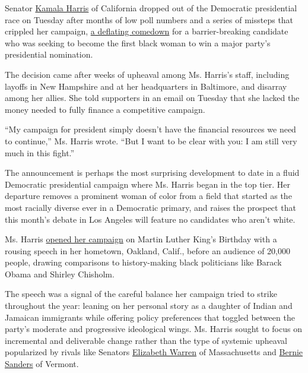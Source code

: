 Senator
\href{https://www.nytimes.com/interactive/2020/us/elections/kamala-harris.html}{Kamala
Harris} of California dropped out of the Democratic presidential race on
Tuesday after months of low poll numbers and a series of missteps that
crippled her campaign,
\href{https://www.nytimes.com/2019/11/29/us/politics/kamala-harris-2020.html}{a
deflating comedown} for a barrier-breaking candidate who was seeking to
become the first black woman to win a major party's presidential
nomination.

The decision came after weeks of upheaval among Ms. Harris's staff,
including layoffs in New Hampshire and at her headquarters in Baltimore,
and disarray among her allies. She told supporters in an email on
Tuesday that she lacked the money needed to fully finance a competitive
campaign.

``My campaign for president simply doesn't have the financial resources
we need to continue,'' Ms. Harris wrote. ``But I want to be clear with
you: I am still very much in this fight.''

The announcement is perhaps the most surprising development to date in a
fluid Democratic presidential campaign where Ms. Harris began in the top
tier. Her departure removes a prominent woman of color from a field that
started as the most racially diverse ever in a Democratic primary, and
raises the prospect that this month's debate in Los Angeles will feature
no candidates who aren't white.

Ms. Harris
\href{https://www.nytimes.com/2019/01/27/us/politics/kamala-harris-rally-2020.html}{opened
her campaign} on Martin Luther King's Birthday with a rousing speech in
her hometown, Oakland, Calif., before an audience of 20,000 people,
drawing comparisons to history-making black politicians like Barack
Obama and Shirley Chisholm.

The speech was a signal of the careful balance her campaign tried to
strike throughout the year: leaning on her personal story as a daughter
of Indian and Jamaican immigrants while offering policy preferences that
toggled between the party's moderate and progressive ideological wings.
Ms. Harris sought to focus on incremental and deliverable change rather
than the type of systemic upheaval popularized by rivals like Senators
\href{https://www.nytimes.com/interactive/2020/us/elections/elizabeth-warren.html}{Elizabeth
Warren} of Massachusetts and
\href{https://www.nytimes.com/interactive/2020/us/elections/bernie-sanders.html}{Bernie
Sanders} of Vermont.


